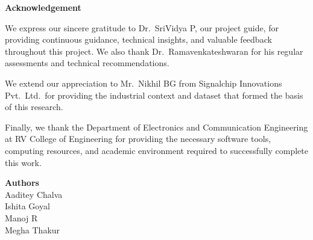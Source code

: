 \vspace{-1cm}

\begin{center}
\textbf{\Large{Acknowledgement}}
\end{center}

We express our sincere gratitude to Dr.\ SriVidya P, our project guide, for providing continuous guidance, technical insights, and valuable feedback throughout this project. We also thank Dr.\ Ramavenkateshwaran for his regular assessments and technical recommendations.

We extend our appreciation to Mr.\ Nikhil BG from Signalchip Innovations Pvt.\ Ltd.\ for providing the industrial context and dataset that formed the basis of this research.

Finally, we thank the Department of Electronics and Communication Engineering at RV College of Engineering for providing the necessary software tools, computing resources, and academic environment required to successfully complete this work.

\vspace{1.5cm}
\begin{flushright}
  \noindent\textbf{Authors} \\
  Aaditey Chalva \\
  Ishita Goyal \\
  Manoj R \\
  Megha Thakur \\
\end{flushright}
\pagebreak
